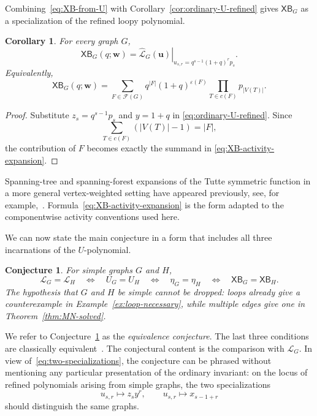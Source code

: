 \documentclass[11pt]{article}
\theoremstyle{plain}
\newtheorem{corollary}[theorem]{Corollary}
\newtheorem{conjecture}[theorem]{Conjecture}
\theoremstyle{definition}
\renewcommand{\mathcal}{\mathscr}
\newcommand{\LL}{\mathcal{L}}    %
\newcommand{\cF}{\mathcal{F}}    %
\newcommand{\bu}{\mathbf{u}}
\newcommand{\bw}{\mathbf{w}}
\newcommand{\XB}{\mathsf{XB}} %
\newcommand{\eps}{\varepsilon}
\numberwithin{equation}{section}
\begin{document}
Combining~\eqref{eq:XB-from-U} with
Corollary~\ref{cor:ordinary-U-refined} gives $\XB_G$ as a specialization
of the refined loopy polynomial.

\begin{corollary}\label{cor:refined-L-determines-XB}
For every graph $G$,
\begin{equation}\label{eq:XB-from-refined-L}
   \XB_G(q;\bw)
   =
   \left.
      \widehat{\LL}_G(\bu)
   \right|_{u_{s,r}=q^{s-1}(1+q)^r p_s}.
\end{equation}
Equivalently,
\begin{equation}\label{eq:XB-activity-expansion}
   \XB_G(q;\bw)
   =
   \sum_{F\in\cF(G)}
   q^{|F|}(1+q)^{\eps(F)}
   \prod_{T\in c(F)}p_{|V(T)|}.
\end{equation}
\end{corollary}

\begin{proof}
Substitute $z_s=q^{s-1}p_s$ and $y=1+q$ in
\eqref{eq:ordinary-U-refined}.  Since
\[
   \sum_{T\in c(F)}(|V(T)|-1)=|F|,
\]
the contribution of $F$ becomes exactly the summand in
\eqref{eq:XB-activity-expansion}.
\end{proof}

Spanning-tree and spanning-forest expansions of the Tutte symmetric function
in a more general vertex-weighted setting have appeared previously, see, for
example,~\cite{ACSZ}.  Formula~\eqref{eq:XB-activity-expansion} is the form
adapted to the componentwise activity conventions used here.

We can now state the main conjecture in a form that includes all three incarnations of the $U$-polynomial.

\begin{conjecture}
\label{conj:L-XB-equivalence}
For simple graphs $G$ and $H$,
\begin{equation}\label{eq:L-XB-conjecture}
   \LL_G=\LL_H
   \quad\Longleftrightarrow\quad
   U_G=U_H
   \quad\Longleftrightarrow\quad
   \eta_G=\eta_H
   \quad\Longleftrightarrow\quad
   \XB_G=\XB_H.
\end{equation}
The hypothesis that $G$ and $H$ be simple cannot be dropped: loops already
give a counterexample in Example~\ref{ex:loop-necessary}, while multiple
edges give one in Theorem~\ref{thm:MN-solved}.
\end{conjecture}

We refer to Conjecture~\ref{conj:L-XB-equivalence} as the \emph{equivalence conjecture}.
The last three conditions are classically equivalent~\cite{NW,Sar,MN,Nob}.
The conjectural content is the comparison with $\LL_G$.
In view of~\eqref{eq:two-specializations}, the conjecture can be phrased without
mentioning any particular presentation of the ordinary invariant: on the
locus of refined polynomials arising from simple graphs, the two specializations
\[
   u_{s,r}\mapsto z_s y^r,  \qquad  u_{s,r}\mapsto x_{s-1+r}
\]
should distinguish the same graphs.
\end{document}
